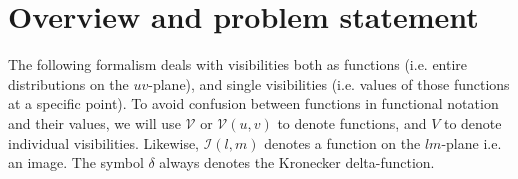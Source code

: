 \documentclass[useAMS,usenatbib]{mn2e}
\begin{document}
\section{Overview and problem statement}

\newcommand{\VV}{\mathcal{V}}
\newcommand{\PP}{\mathcal{P}}
\newcommand{\VVM}{\mathcal{V}^\mathrm{M}}
\newcommand{\WW}{\mathcal{W}}
\newcommand{\II}{\mathcal{I}}
\newcommand{\IID}{\mathcal{I}^\mathrm{D}}
\newcommand{\IIDI}{\mathcal{I}^\mathrm{DI}}
\newcommand{\EE}{\mathcal{E}}
\newcommand{\FF}{\mathcal{F}}
\newcommand{\HH}{\mathcal{H}}
\newcommand{\TT}{\mathcal{T}}
\newcommand{\NN}{\mathcal{N}}
\newcommand{\uu}{\bmath{u}}
\newcommand{\Btf}{\mathsf{B}^{[\Delta t\Delta\nu]}}
\newcommand{\Babtf}{\mathsf{B}^{[\alpha\Delta t,\beta\Delta\nu]}}
\newcommand{\Bab}{\mathsf{B}^{[\alpha\beta]}}
\newcommand{\Buv}{\mathsf{B}^{[uv]}}
\newcommand{\Bij}{\mathsf{B}}
\newcommand{\Ptf}{\Pi^{[t\nu]}}
\newcommand{\Puv}{\Pi^{[uv]}}
\newcommand{\Vm}{V^\mathrm{M}}
\newcommand{\Vs}{V^\mathrm{S}}
% 
The following formalism deals with visibilities both as functions (i.e. entire distributions on the $uv$-plane), 
and single visibilities (i.e. values of those functions at a specific point). To avoid confusion between functions in
functional notation and their values, we will use $\VV$ or 
$\VV(u,v)$ to denote functions, and $V$ to denote individual visibilities. Likewise, $\II(l,m)$ denotes a function 
on the $lm$-plane i.e. an image. The symbol $\delta$ always denotes the Kronecker delta-function.
\end{document}

